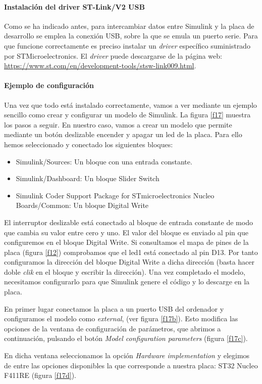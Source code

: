\documentclass[10pt,a4paper]{report}
\begin{document}
\paragraph{Instalación del driver ST-Link/V2 USB}
Como se ha indicado antes, para intercambiar datos entre Simulink  y la placa de desarrollo se emplea la conexión USB, sobre la que se emula un puerto serie. Para que funcione correctamente es preciso instalar un \emph{driver} específico suministrado por STMicroelectronics. El \emph{driver} puede descargarse de la página web: \url{https://www.st.com/en/development-tools/stsw-link009.html}.
\paragraph{Ejemplo de configuración}
Una vez que todo está instalado correctamente, vamos a ver mediante un ejemplo sencillo como crear y configurar un modelo de Simulink. La figura \ref{f17} muestra los pasos a seguir. En nuestro caso, vamos a crear un modelo que permite mediante un botón deslizable encender y apagar un led de la placa. Para ello hemos seleccionado y conectado los siguientes bloques:
\begin{itemize}
\item Simulink/Sources: Un bloque con una entrada constante.
\item Simulink/Dashboard: Un bloque Slider Switch
\item Simulink Coder Support Package for STmicroelectronics Nucleo Boards/Common: Un bloque Digital Write  
\end{itemize}
El interruptor deslizable está conectado al bloque de entrada constante de modo que cambia su valor entre cero y uno. El valor del bloque es enviado al pin que configuremos en el bloque Digital Write. Si consultamos el mapa de pines de la placa (figura \ref{f12}) comprobamos que el led1 está conectado al pin D13. Por tanto configuramos la dirección del bloque Digital Write a dicha dirección (basta hacer doble \emph{clik} en el bloque y escribir la dirección). Una vez completado el modelo, necesitamos configurarlo para que Simulink genere el código y lo descarge en la placa.


En primer lugar conectamos la placa a un puerto USB del ordenador y configuramos el modelo como \emph{external}, (ver figura \ref{f17b}). Esto modifica las opciones de la ventana de configuración de parámetros, que abrimos a continuación, pulsando el botón \emph{Model configuration parameters} (figura \ref{f17c}). 

En dicha ventana seleccionamos la opción \emph{Hardware implementation} y elegimos de entre las opciones disponibles la que corresponde a nuestra placa: ST32 Nucleo F411RE (figura \ref{f17d}). 
\end{document}
